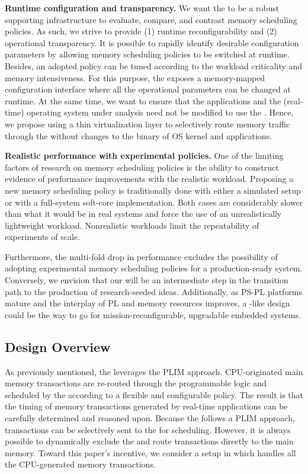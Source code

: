 \par{\bf Runtime configuration and transparency.} We want the \schim
to be a robust supporting infrastructure to evaluate, compare, and
contrast memory scheduling policies. As such, we strive to provide (1)
runtime reconfigurability and (2) operational transparency. It is possible to rapidly identify desirable configuration parameters by
allowing memory scheduling policies to be switched at runtime. Besides, an adopted policy can be tuned according to the workload criticality and memory intensiveness. For this purpose, the \schim exposes a memory-mapped
configuration interface where all the operational parameters can be
changed at runtime. At the same time, we want to ensure that the
applications and the (real-time) operating system under analysis need
not be modified to use the \schim. Hence, we propose using a
thin virtualization layer to selectively route memory traffic through
the \schim without changes to the binary of OS kernel and
applications.

\par{\bf Realistic performance with experimental policies.} One of the
limiting factors of research on memory scheduling policies is the
ability to construct evidence of performance improvements with
the realistic workload. Proposing a new memory scheduling policy is
traditionally done with either a simulated setup or with a
full-system soft-core implementation. Both cases are considerably slower than what it would be in real systems and force the use of an unrealistically lightweight workload. Nonrealistic workloads limit the repeatability of experiments of scale.

Furthermore, the multi-fold drop in performance excludes the
possibility of adopting experimental memory scheduling policies for a
production-ready system. Conversely, we envision that our \schim will
be an intermediate step in the transition path to the production of
research-seeded ideas. Additionally, as PS-PL platforms mature and the interplay of PL and memory resources improves, a \schim-like design
could be the way to go for mission-reconfigurable, upgradable embedded
systems.

\subsection{Design Overview}
As previously mentioned, the \schim leverages the PLIM
approach. CPU-originated main memory transactions are re-routed
through the programmable logic and scheduled by the \schim according
to a flexible and configurable policy. The result is that the timing
of memory transactions generated by real-time applications can be
carefully determined and reasoned upon. Because the \schim follows a
PLIM approach, transactions can be selectively sent to the \schim for
scheduling. However, it is always possible to dynamically exclude the
\schim and route transactions directly to the main memory. Toward this paper's incentive, we consider a setup in which \schim handles all the CPU-generated memory transactions.


